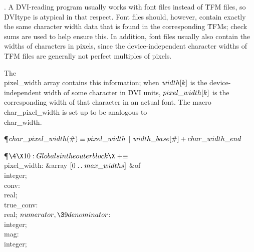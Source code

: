 . A \.{DVI}-reading program usually works with font files instead of
\.{TFM} files, so \.{DVItype} is atypical in that respect. Font files
should, however, contain exactly the same character width data that is
found in the corresponding \.{TFM}s; check sums are used to help
ensure this. In addition, font files usually also contain the widths of
characters in pixels, since the device-independent character widths of
\.{TFM} files are generally not perfect multiples of pixels.

The \\{pixel\_width} array contains this information; when $\\{width}[\|k]$ is
the
device-independent width of some character in \.{DVI} units, $\\{pixel\_width}[%
\|k]$
is the corresponding width of that character in an actual font.
The macro \\{char\_pixel\_width} is set up to be analogous to \\{char\_width}.

\Y\P\D $\\{char\_pixel\_width}(\#)\S\\{pixel\_width}$ [ $\\{width\_base}[\#]+%
\\{char\_width\_end}$\par
\Y\P$\4\X10:Globals in the outer block\X\mathrel{+}\S$\6
\4\\{pixel\_width}: \&{array} $[0\to\\{max\_widths}]$ \1\&{of}\5
\\{integer};\2\6
\4\\{conv}: \\{real};\6
\4\\{true\_conv}: \\{real};\6
\4$\\{numerator},\39\\{denominator}$: \\{integer};\6
\4\\{mag}: \\{integer};\par
\fi

